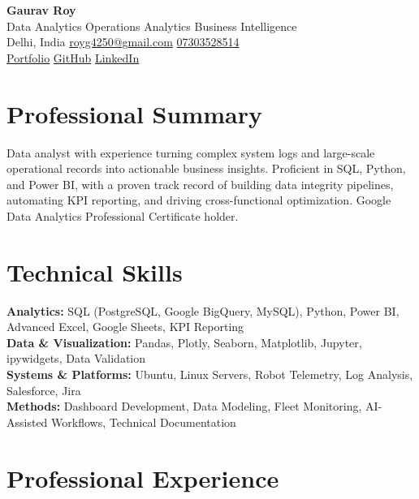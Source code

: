 \documentclass[10pt,a4paper]{article}
\begin{document}
\small

\begin{center}
  {\LARGE\bfseries Gaurav Roy}\\[-1pt]
  {\normalsize Data Analytics \textbar{} Operations Analytics \textbar{} Business Intelligence}\\[3pt]
  Delhi, India
  \textbar{} \href{mailto:royg4250@gmail.com}{royg4250@gmail.com}
  \textbar{} \href{tel:07303528514}{07303528514}\\[-1pt]
  \href{https://gauravroyportfolio.netlify.app}{Portfolio}
  \textbar{} \href{https://github.com/GauravRoy092}{GitHub}
  \textbar{} \href{https://linkedin.com/in/gaurav-roy-6580b222b}{LinkedIn}
\end{center}

\section{Professional Summary}
Data analyst with experience turning complex system logs and large-scale operational records into actionable business insights. Proficient in SQL, Python, and Power BI, with a proven track record of building data integrity pipelines, automating KPI reporting, and driving cross-functional optimization. Google Data Analytics Professional Certificate holder.

\section{Technical Skills}
\textbf{Analytics:} SQL (PostgreSQL, Google BigQuery, MySQL), Python, Power BI, Advanced Excel, Google Sheets, KPI Reporting\\
\textbf{Data \& Visualization:} Pandas, Plotly, Seaborn, Matplotlib, Jupyter, ipywidgets, Data Validation\\
\textbf{Systems \& Platforms:} Ubuntu, Linux Servers, Robot Telemetry, Log Analysis, Salesforce, Jira\\
\textbf{Methods:} Dashboard Development, Data Modeling, Fleet Monitoring, AI-Assisted Workflows, Technical Documentation

\section{Professional Experience}
\end{document}

